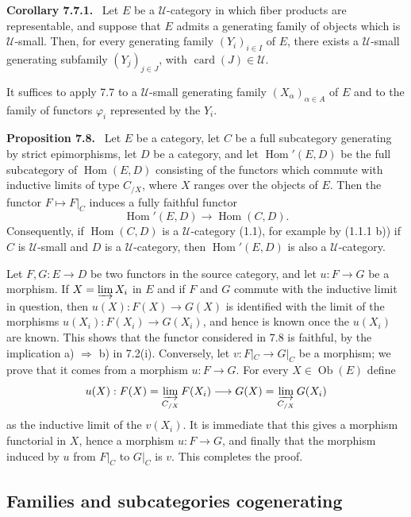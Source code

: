 \documentclass[11pt]{article}
\newcommand{\U}{\mathcal{U}}
\newcommand{\Ob}{\operatorname{Ob}}
\newcommand{\card}{\operatorname{card}}
\newcommand{\Hhom}{\operatorname{Hom}}
\newenvironment{statement}[1]{\par\medskip\noindent\textbf{#1.}\ }{\par\medskip}
\begin{document}
\begin{statement}{Corollary 7.7.1}
Let $E$ be a $\U$-category in which fiber products are representable, and suppose that $E$ admits a generating family of objects which is $\U$-small. Then, for every generating family $(Y_i)_{i\in I}$ of $E$, there exists a $\U$-small generating subfamily $(Y_j)_{j\in J}$, with $\card(J)\in\U$.
\end{statement}

It suffices to apply 7.7 to a $\U$-small generating family $(X_\alpha)_{\alpha\in A}$ of $E$ and to the family of functors $\varphi_i$ represented by the $Y_i$.

\begin{statement}{Proposition 7.8}
Let $E$ be a category, let $C$ be a full subcategory generating by strict epimorphisms, let $D$ be a category, and let $\Hhom'(E,D)$ be the full subcategory of $\Hhom(E,D)$ consisting of the functors which commute with inductive limits of type $C_{/X}$, where $X$ ranges over the objects of $E$. Then the functor $F\mapsto F|_C$ induces a fully faithful functor
\[
\Hhom'(E,D)\longrightarrow\Hhom(C,D).
\]
Consequently, if $\Hhom(C,D)$ is a $\U$-category (1.1), for example by (1.1.1 b)) if $C$ is $\U$-small and $D$ is a $\U$-category, then $\Hhom'(E,D)$ is also a $\U$-category.
\end{statement}

Let $F,G:E\to D$ be two functors in the source category, and let $u:F\to G$ be a morphism. If $X=\varinjlim X_i$ in $E$ and if $F$ and $G$ commute with the inductive limit in question, then $u(X):F(X)\to G(X)$ is identified with the limit of the morphisms $u(X_i):F(X_i)\to G(X_i)$, and hence is known once the $u(X_i)$ are known. This shows that the functor considered in 7.8 is faithful, by the implication a) $\Rightarrow$ b) in 7.2(i). Conversely, let $v:F|_C\to G|_C$ be a morphism; we prove that it comes from a morphism $u:F\to G$. For every $X\in\Ob(E)$ define
\[
u(X):F(X)=\varinjlim_{C_{/X}}F(X_i)\longrightarrow G(X)=\varinjlim_{C_{/X}}G(X_i)
\]
as the inductive limit of the $v(X_i)$. It is immediate that this gives a morphism functorial in $X$, hence a morphism $u:F\to G$, and finally that the morphism induced by $u$ from $F|_C$ to $G|_C$ is $v$. This completes the proof.

\subsection{Families and subcategories cogenerating}
\end{document}
